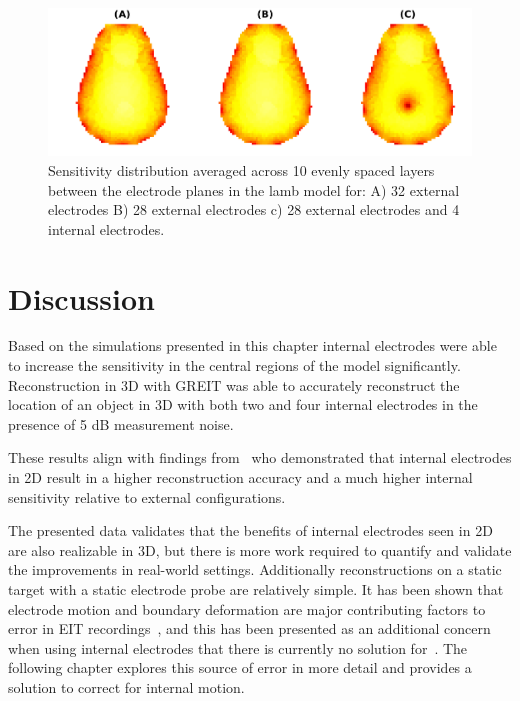\begin{figure}
\centering
\includegraphics[width=\columnwidth]{chapter6-internal_electrodes/imgs/lamb_sensitivity_profiles.pdf}
\caption[Sensitivity distribution in a lamb model]{\label{fig:sens_example}%
Sensitivity distribution averaged across 10 evenly spaced layers
between the electrode planes in the lamb model for: 
A) 32 external electrodes 
B) 28 external electrodes 
c) 28 external electrodes and 4 internal electrodes.
}
\end{figure}

\section{Discussion}

Based on the simulations presented in this chapter 
internal electrodes were able to increase the sensitivity in 
the central regions of the model significantly. 
Reconstruction in 3D with GREIT was able to accurately 
reconstruct the location of an object in 3D with both 
two and four internal electrodes in the presence of 5 dB 
measurement noise. 

These results align with findings 
from~
who demonstrated that internal electrodes in 2D 
result in a higher reconstruction accuracy and 
a much higher internal sensitivity relative to external configurations.

The presented data validates that the benefits of internal electrodes seen in 2D
are also realizable in 3D, but there is more 
work required to quantify and validate the improvements in real-world settings. 
Additionally reconstructions on a static target with a static electrode probe
are relatively simple. It has been shown that electrode motion and boundary
deformation are major contributing factors to error in EIT 
recordings~\parencite{boyle_impact_2011,grychtol_impact_2012}, and this 
has been presented as an additional concern when using internal electrodes
that there is currently no solution for~\parencite{nguyen_electrical_2020}.
The following chapter explores this source of error in more detail and 
provides a solution to correct for internal motion.

